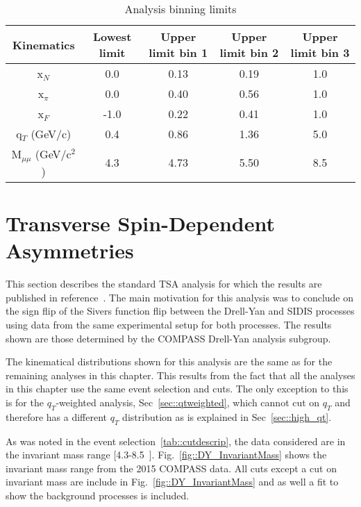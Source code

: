 \begin{table}[h!t]
  \centering
  \begin{tabular}{ |c|c|c|c|c| }
    \hline \textbf{Kinematics}& \textbf{Lowest limit}& \textbf{Upper limit bin
      1}& \textbf{Upper limit bin 2}& \textbf{Upper limit bin 3}\\ \hline
    
    x$_N$& 0.0& 0.13& 0.19& 1.0\\ \hline x$_{\pi}$& 0.0& 0.40& 0.56&
    1.0\\ \hline x$_F$& -1.0& 0.22& 0.41& 1.0\\ \hline q$_T$ (GeV/c)& 0.4& 0.86&
    1.36& 5.0\\ \hline M$_{\mu\mu}$ (GeV/c$^2$)& 4.3& 4.73& 5.50& 8.5 \\ \hline
    
  \end{tabular}
  \caption{Analysis binning limits}
  \label{tab::binning}
\end{table}

\section{Transverse Spin-Dependent Asymmetries} \label{sec::standTSA}
This section describes the standard TSA analysis for which the results are
published in reference~\cite{compassDYpaper}.  The main motivation for this
analysis was to conclude on the sign flip of the Sivers function flip between
the Drell-Yan and SIDIS processes using data from the same experimental setup
for both processes.  The results shown are those determined by the COMPASS
Drell-Yan analysis subgroup.

The kinematical distributions shown for this analysis are the same as for the
remaining analyses in this chapter.  This results from the fact that all the
analyses in this chapter use the same event selection and cuts.  The only
exception to this is for the $q_T$-weighted analysis, Sec~\ref{sec::qtweighted},
which cannot cut on $q_T$ and therefore has a different $q_T$ distribution as is
explained in Sec~\ref{sec::high_qt}.

As was noted in the event selection~\ref{tab::cutdescrip}, the data considered
are in the invariant mass range [4.3-8.5~{\gvcw}].
Fig.~\ref{fig::DY_InvariantMass} shows the invariant mass range from the 2015
COMPASS data.  All cuts except a cut on invariant mass are include in
Fig.~\ref{fig::DY_InvariantMass} and as well a fit to show the background
processes is included.

